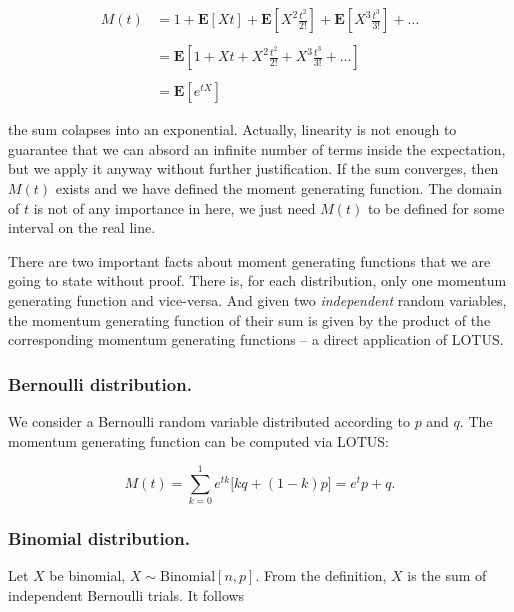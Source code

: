 \documentclass[12pt]{article}
\begin{document}
\begin{align}
M(t) &= 1 + \mathbf{E}[X t ]  + \mathbf{E}\left[ X^{2} \frac{t^{2}}{2!} \right]  + 
\mathbf{E} \left[ X^{3} \frac{t^{3}}{3!} \right] + \ldots
\nonumber \\
\nonumber \\
&= \mathbf{E} \left[ 1 + X t + X^{2} \frac{t^{2}}{2!} + X^{3} \frac{t^{3}}{3!} + \ldots \right]
\nonumber \\
\nonumber \\
& = \mathbf{E} \left[ e^{t X } \right]
\end{align}

\noindent
the sum colapses into an exponential.
Actually, linearity is not enough to guarantee that we can absord an infinite number of 
terms inside the expectation, but we apply it anyway without further justification.
If the sum converges, then $M(t)$ exists and we have defined the moment generating function.
The domain of $t$ is not of any importance in here, we just need $M(t)$ to be defined for
some interval on the real line.

There are two important facts about moment generating functions
that we are going to state without proof. 
There is, for each distribution, only one momentum generating function and vice-versa. And
given two \textit{independent} random variables, the momentum generating function of their 
sum is given by the product of the corresponding momentum generating functions -- a direct
application of LOTUS.

\subsubsection{Bernoulli distribution.}

We consider a Bernoulli random variable distributed according 
to $p$ and $q$.
The momentum generating function can be computed via LOTUS:

\begin{equation}
M(t) = \sum_{k = 0}^{1} e^{tk} \bigg[ kq + (1 - k)p \bigg] 
= e^{t} p + q.
\end{equation}

\subsubsection{Binomial distribution.}

Let $X$ be binomial, $X \sim \text{Binomial}[n,p]$.
From the definition, $X$ is the sum of independent Bernoulli trials.
It follows
\end{document}

